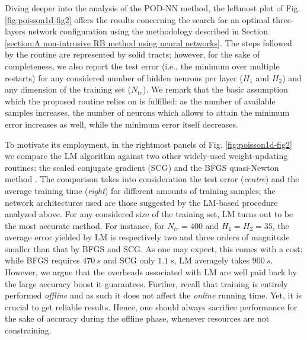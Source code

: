 \documentclass[longtitle]{elsarticle}
\numberwithin{equation}{section}
\theoremstyle{theorem}
\theoremstyle{definition}
\theoremstyle{remark}
\theoremstyle{proposition}
\numberwithin{figure}{section}
\begin{document}
		Diving deeper into the analysis of the POD-NN method, the leftmost plot of Fig. \ref{fig:poisson1d-fig2} offers the results concerning the search for an optimal three-layers network configuration using the methodology described in Section \ref{section:A non-intrusive RB method using neural networks}. The steps followed by the routine are represented by solid tracts; however, for the sake of completeness, we also report the test error (i.e., the minimum over multiple restarts) for any considered number of hidden neurons per layer ($H_1$ and $H_2$) and any dimension of the training set ($N_{tr}$). We remark that the basic assumption which the proposed routine relies on is fulfilled: as the number of available samples increases, the number of neurons which allows to attain the minimum error increases as well, while the minimum error itself decreases.
		
		To motivate its employment, in the rightmost panels of Fig. \ref{fig:poisson1d-fig2} we compare the LM algorithm against two other widely-used weight-updating routines: the scaled conjugate gradient (SCG) \cite{Mol93} and the BFGS quasi-Newton method \cite{GMW81}. The comparison takes into consideration the test error (\emph{centre}) and the average training time (\emph{right}) for different amounts of training samples; the network architectures used are those suggested by the LM-based procedure analyzed above. For any considered size of the training set, LM turns out to be the most accurate method. For instance, for $N_{tr} = 400$ and $H_1 = H_2 = 35$, the average error yielded by LM is respectively two and three orders of magnitude smaller than that by BFGS and SCG. As one may expect, this comes with a cost: while BFGS requires $470~s$ and SCG only $1.1~s$, LM averagely takes $900~s$. However, we argue that the overheads associated with LM are well paid back by the large accuracy boost it guarantees. Further, recall that training is entirely performed \emph{offline} and as such it does not affect the \emph{online} running time. Yet, it is crucial to get reliable results. Hence, one should always sacrifice performance for the sake of accuracy during the offline phase, whenever resources are not constraining.
\end{document}
